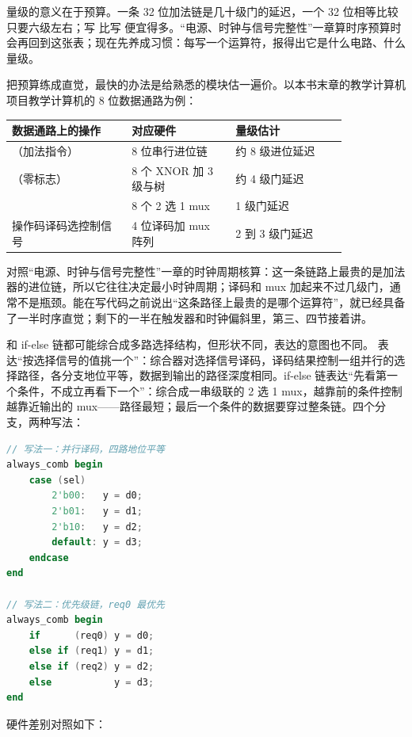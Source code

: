量级的意义在于预算。一条 32 位加法链是几十级门的延迟，一个 32 位相等比较只要六级左右；写  比写  便宜得多。“电源、时钟与信号完整性”一章算时序预算时会再回到这张表；现在先养成习惯：每写一个运算符，报得出它是什么电路、什么量级。

把预算练成直觉，最快的办法是给熟悉的模块估一遍价。以本书末章的教学计算机项目教学计算机的 8 位数据通路为例：

\begin{longtable}{L{0.3\linewidth}L{0.26\linewidth}L{0.28\linewidth}}
\toprule
数据通路上的操作 & 对应硬件 & 量级估计 \\
\midrule
{}（加法指令） & 8 位串行进位链 & 约 8 级进位延迟 \\\tablerowrule
{}（零标志） & 8 个 XNOR 加 3 级与树 & 约 4 级门延迟 \\\tablerowrule
{} & 8 个 2 选 1 mux & 1 级门延迟 \\\tablerowrule
操作码译码选控制信号 & 4 位译码加 mux 阵列 & 2 到 3 级门延迟 \\
\bottomrule
\end{longtable}

对照“电源、时钟与信号完整性”一章的时钟周期核算：这一条链路上最贵的是加法器的进位链，所以它往往决定最小时钟周期；译码和 mux 加起来不过几级门，通常不是瓶颈。能在写代码之前说出“这条路径上最贵的是哪个运算符”，就已经具备了一半时序直觉；剩下的一半在触发器和时钟偏斜里，第三、四节接着讲。

 和 if-else 链都可能综合成多路选择结构，但形状不同，表达的意图也不同。 表达“按选择信号的值挑一个”：综合器对选择信号译码，译码结果控制一组并行的选择路径，各分支地位平等，数据到输出的路径深度相同。if-else 链表达“先看第一个条件，不成立再看下一个”：综合成一串级联的 2 选 1 mux，越靠前的条件控制越靠近输出的 mux——路径最短；最后一个条件的数据要穿过整条链。四个分支，两种写法：

\begin{lstlisting}[language=Verilog]
// 写法一：并行译码，四路地位平等
always_comb begin
    case (sel)
        2'b00:   y = d0;
        2'b01:   y = d1;
        2'b10:   y = d2;
        default: y = d3;
    endcase
end

// 写法二：优先级链，req0 最优先
always_comb begin
    if      (req0) y = d0;
    else if (req1) y = d1;
    else if (req2) y = d2;
    else           y = d3;
end
\end{lstlisting}

硬件差别对照如下：

